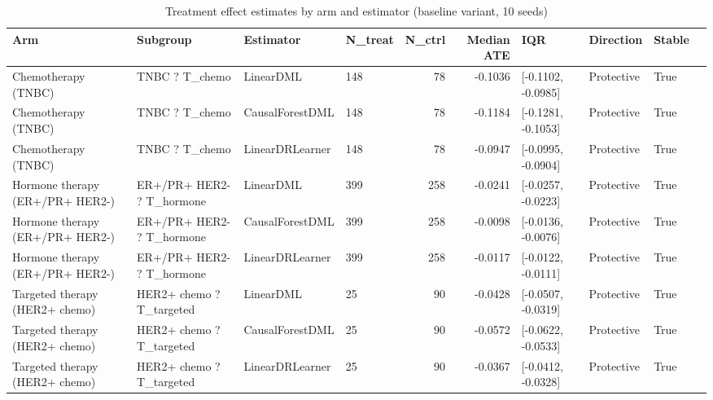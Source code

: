 \begin{table}[htbp]
\centering
\caption{Treatment effect estimates by arm and estimator (baseline variant, 10 seeds)}
\label{tab:ate_results}
\begin{tabular}{llllrrllll}
\toprule
Arm & Subgroup & Estimator & N\_treat & N\_ctrl & Median ATE & IQR & Direction & Stable \\
\midrule
Chemotherapy (TNBC) & TNBC ? T_chemo & LinearDML & 148 & 78 & -0.1036 & [-0.1102, -0.0985] & Protective & True \\
Chemotherapy (TNBC) & TNBC ? T_chemo & CausalForestDML & 148 & 78 & -0.1184 & [-0.1281, -0.1053] & Protective & True \\
Chemotherapy (TNBC) & TNBC ? T_chemo & LinearDRLearner & 148 & 78 & -0.0947 & [-0.0995, -0.0904] & Protective & True \\
Hormone therapy (ER+/PR+ HER2-) & ER+/PR+ HER2- ? T_hormone & LinearDML & 399 & 258 & -0.0241 & [-0.0257, -0.0223] & Protective & True \\
Hormone therapy (ER+/PR+ HER2-) & ER+/PR+ HER2- ? T_hormone & CausalForestDML & 399 & 258 & -0.0098 & [-0.0136, -0.0076] & Protective & True \\
Hormone therapy (ER+/PR+ HER2-) & ER+/PR+ HER2- ? T_hormone & LinearDRLearner & 399 & 258 & -0.0117 & [-0.0122, -0.0111] & Protective & True \\
Targeted therapy (HER2+ chemo) & HER2+ chemo ? T_targeted & LinearDML & 25 & 90 & -0.0428 & [-0.0507, -0.0319] & Protective & True \\
Targeted therapy (HER2+ chemo) & HER2+ chemo ? T_targeted & CausalForestDML & 25 & 90 & -0.0572 & [-0.0622, -0.0533] & Protective & True \\
Targeted therapy (HER2+ chemo) & HER2+ chemo ? T_targeted & LinearDRLearner & 25 & 90 & -0.0367 & [-0.0412, -0.0328] & Protective & True \\
\bottomrule
\end{tabular}
\end{table}